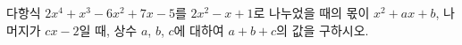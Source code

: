 다항식 $2x^4+x^3-6x^2+7x-5$를 $2x^2-x+1$로 나누었을 때의 몫이 $x^2+ax+b$, 나머지가 $cx-2$일 때, 상수 $a$, $b$, $c$에 대하여 $a+b+c$의 값을 구하시오.
